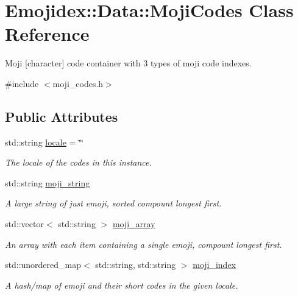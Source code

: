 \hypertarget{classEmojidex_1_1Data_1_1MojiCodes}{}\section{Emojidex\+:\+:Data\+:\+:Moji\+Codes Class Reference}
\label{classEmojidex_1_1Data_1_1MojiCodes}


Moji \mbox{[}character\mbox{]} code container with 3 types of moji code indexes.  




{\ttfamily \#include $<$moji\+\_\+codes.\+h$>$}

\subsection*{Public Attributes}
\begin{DoxyCompactItemize}
\item 
std\+::string \hyperlink{classEmojidex_1_1Data_1_1MojiCodes_a30264352b96dfd99ff288c1669a999cc}{locale} = \char`\"{}\char`\"{}\hypertarget{classEmojidex_1_1Data_1_1MojiCodes_a30264352b96dfd99ff288c1669a999cc}{}\label{classEmojidex_1_1Data_1_1MojiCodes_a30264352b96dfd99ff288c1669a999cc}

\begin{DoxyCompactList}\small\item\em The locale of the codes in this instance. \end{DoxyCompactList}\item 
std\+::string \hyperlink{classEmojidex_1_1Data_1_1MojiCodes_af3d498cd68c0dad96394096631a871ce}{moji\+\_\+string}
\begin{DoxyCompactList}\small\item\em A large string of just emoji, sorted compount longest first. \end{DoxyCompactList}\item 
std\+::vector$<$ std\+::string $>$ \hyperlink{classEmojidex_1_1Data_1_1MojiCodes_a0847d05256542ad50fa8f3b48bf76853}{moji\+\_\+array}\hypertarget{classEmojidex_1_1Data_1_1MojiCodes_a0847d05256542ad50fa8f3b48bf76853}{}\label{classEmojidex_1_1Data_1_1MojiCodes_a0847d05256542ad50fa8f3b48bf76853}

\begin{DoxyCompactList}\small\item\em An array with each item containing a single emoji, compount longest first. \end{DoxyCompactList}\item 
std\+::unordered\+\_\+map$<$ std\+::string, std\+::string $>$ \hyperlink{classEmojidex_1_1Data_1_1MojiCodes_adaa77850c0d3d456c268a15e0f92e3ec}{moji\+\_\+index}\hypertarget{classEmojidex_1_1Data_1_1MojiCodes_adaa77850c0d3d456c268a15e0f92e3ec}{}\label{classEmojidex_1_1Data_1_1MojiCodes_adaa77850c0d3d456c268a15e0f92e3ec}

\begin{DoxyCompactList}\small\item\em A hash/map of emoji and their short codes in the given locale. \end{DoxyCompactList}\end{DoxyCompactItemize}


